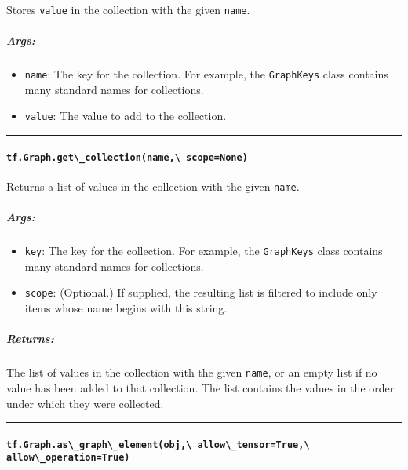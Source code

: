 Stores \lstinline{value} in the collection with the given \lstinline{name}.

\subparagraph{Args: }\label{args-4}

\begin{itemize}
\tightlist
\item
  \lstinline{name}: The key for the collection. For example, the
  \lstinline{GraphKeys} class contains many standard names for collections.
\item
  \lstinline{value}: The value to add to the collection.
\end{itemize}

\begin{center}\rule{0.5\linewidth}{\linethickness}\end{center}

\paragraph{\texorpdfstring{\lstinline{tf.Graph.get\_collection(name,\ scope=None)}
}{tf.Graph.get\_collection(name, scope=None) }}\label{tf.graph.getux5fcollectionname-scopenone}

Returns a list of values in the collection with the given \lstinline{name}.

\subparagraph{Args: }\label{args-5}

\begin{itemize}
\tightlist
\item
  \lstinline{key}: The key for the collection. For example, the
  \lstinline{GraphKeys} class contains many standard names for collections.
\item
  \lstinline{scope}: (Optional.) If supplied, the resulting list is
  filtered to include only items whose name begins with this string.
\end{itemize}

\subparagraph{Returns: }\label{returns-5}

The list of values in the collection with the given \lstinline{name}, or an
empty list if no value has been added to that collection. The list
contains the values in the order under which they were collected.

\begin{center}\rule{0.5\linewidth}{\linethickness}\end{center}

\paragraph{\texorpdfstring{\lstinline{tf.Graph.as\_graph\_element(obj,\ allow\_tensor=True,\ allow\_operation=True)}
}{tf.Graph.as\_graph\_element(obj, allow\_tensor=True, allow\_operation=True) }}\label{tf.graph.asux5fgraphux5felementobj-allowux5ftensortrue-allowux5foperationtrue}

